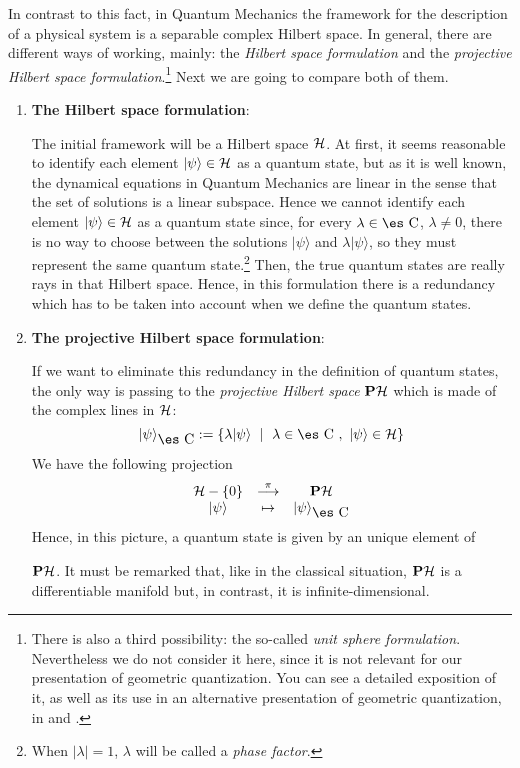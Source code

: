 \documentclass[12pt]{article}
\theoremstyle{plain}
\def\mapping#1{\mathrel{\mathop{\longrightarrow}\limits^{#1}}}
\def\H{{\cal H}}
\def\sta{|\psi \rangle }
\def\Complex{\mbox{\es C}}
\begin{document}
In contrast to this fact,
in Quantum Mechanics the framework for the description of a physical
system
is a separable complex Hilbert space.
In general, there are different ways of working, mainly: the {\it
Hilbert space formulation}
and the {\it projective Hilbert space formulation}.\footnote{
There is also a third possibility:
the so-called {\it unit sphere formulation}.
Nevertheless we do not consider it here,
since it is not relevant for our presentation
of geometric quantization.
You can see a detailed exposition of it,
as well as its use in an alternative
presentation of geometric quantization, in
\cite{Tu-85} and \cite{Tu-96}.
}
Next we are going to compare both of them.
\begin{enumerate}
\item
{\bf The Hilbert space formulation}:

The initial framework will be a Hilbert space $\H$.
At first, it seems reasonable to identify each element
$\sta \in \H$ as a quantum state, but as it is well known,
the dynamical equations in Quantum Mechanics are linear
in the sense that the set of solutions is a linear subspace.
Hence  we cannot identify each element $\sta \in \H$ as a quantum state
since,
for every $\lambda \in \Complex$, $\lambda \not= 0$,
there is no way to choose between the solutions
$\sta$ and $\lambda\sta$, so they must represent the same quantum state.\footnote{
When $\mid \lambda \mid = 1$,
$\lambda$ will be called a {\it phase factor}.
}
Then, the true quantum states are really rays in that Hilbert space.
Hence, in this formulation there is a redundancy which has to be
taken into account when we define the quantum states.
\item
{\bf The projective Hilbert space formulation}:

If we want to eliminate this redundancy in the definition of quantum
states,
the only way is passing to the {\it projective Hilbert space}
${\bf P}\H$ which is made of the complex lines in $\H$:
$$
\sta_{\Complex} := \{ \lambda \sta \ \mid \ \lambda \in \Complex
\ , \ \sta \in \H \}
$$
We have the following projection
$$
\begin{array}{ccc}
\H -\{ 0 \} & \mapping{\pi} & {\bf P}\H
\\
\sta & \mapsto & \sta_{\Complex}
\end{array}
$$
Hence, in this picture, a quantum state is given by an unique element of

${\bf P}\H$.
It must be remarked that, like in the classical situation,
${\bf P}\H$ is a differentiable manifold but, in contrast, it is
infinite-dimensional.
\end{enumerate}
\end{document}
